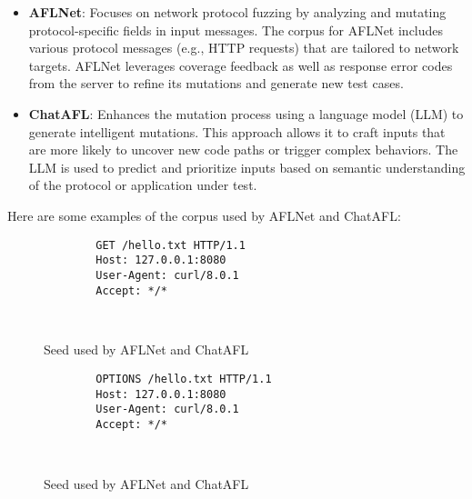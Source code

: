\begin{itemize}
    \item \textbf{AFLNet}: Focuses on network protocol fuzzing by analyzing and mutating protocol-specific fields in input messages. The corpus for AFLNet includes various protocol messages (e.g., HTTP requests) that are tailored to network targets. AFLNet leverages coverage feedback as well as response error codes from the server to refine its mutations and generate new test cases.

    \item \textbf{ChatAFL}: Enhances the mutation process using a language model (LLM) to generate intelligent mutations. This approach allows it to craft inputs that are more likely to uncover new code paths or trigger complex behaviors. The LLM is used to predict and prioritize inputs based on semantic understanding of the protocol or application under test.
\end{itemize}

Here are some examples of the corpus used by AFLNet and ChatAFL:
\begin{figure}[H]
    \centering
    \begin{adjustbox}{valign=t}
    \begin{lstlisting}
        GET /hello.txt HTTP/1.1
        Host: 127.0.0.1:8080
        User-Agent: curl/8.0.1
        Accept: */*
        
            
    \end{lstlisting}
    \end{adjustbox}
    \caption{Seed used by AFLNet and ChatAFL}
\end{figure}

\begin{figure}[H]
    \centering
    \begin{adjustbox}{valign=t}
    \begin{lstlisting}
        OPTIONS /hello.txt HTTP/1.1
        Host: 127.0.0.1:8080
        User-Agent: curl/8.0.1
        Accept: */*

    
    \end{lstlisting}
    \end{adjustbox}
    \caption{Seed used by AFLNet and ChatAFL}
\end{figure}

